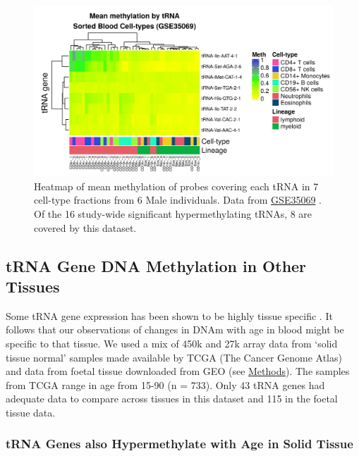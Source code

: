\documentclass[
]{book}
\begin{document}
\begin{figure}

{\centering \includegraphics[width=1\linewidth]{./figs/meanMethbytRNAMatLowBB6_bl} 

}

\caption{Heatmap \citep{Gu2016} of mean methylation of probes covering each tRNA in 7 cell-type fractions from 6 Male individuals. Data from \href{https://www.ncbi.nlm.nih.gov/geo/query/acc.cgi?acc=GSE35069}{GSE35069} \citep{Reinius2012}. Of the 16 study-wide significant hypermethylating tRNAs, 8 are covered by this dataset.}\label{fig:meanMethbytRNAMatLowBB6}
\end{figure}



\hypertarget{trna-gene-dna-methylation-in-other-tissues}{%
\subsection{tRNA Gene DNA Methylation in Other Tissues}\label{trna-gene-dna-methylation-in-other-tissues}}

Some tRNA gene expression has been shown to be highly tissue specific \citep{Schmitt2014b, Dittmar2006, Sagi2016}.
It follows that our observations of changes in DNAm with age in blood might be specific to that tissue.
We used a mix of 450k and 27k array data from `solid tissue normal' samples made available by TCGA (The Cancer Genome Atlas) and data from foetal tissue \citep{Yang2016, Nazor2012} downloaded from GEO (see \protect\hyperlink{TCGAmethods}{Methods}).
The samples from TCGA range in age from 15-90 (n = 733).
Only 43 tRNA genes had adequate data to compare across tissues in this dataset and 115 in the foetal tissue data.

\hypertarget{trna-genes-also-hypermethylate-with-age-in-solid-tissue}{%
\subsubsection{tRNA Genes also Hypermethylate with Age in Solid Tissue}\label{trna-genes-also-hypermethylate-with-age-in-solid-tissue}}
\end{document}
